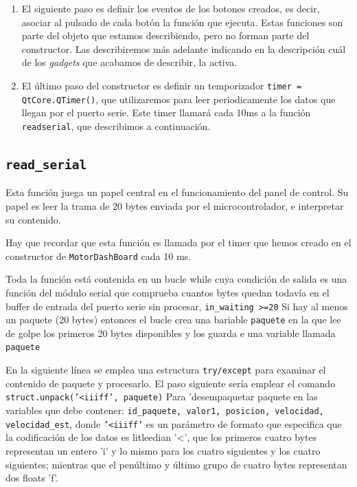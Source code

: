 \begin{enumerate}
\begin{enumerate}
        \item \texttt{btn\_speed\_ss} Análogo al anterior, solo que ahora el control de velocidad se lleva a cabo empleando realimentación de estados estimados.   
    \end{enumerate}
    \item El siguiente paso es definir los eventos de los botones creados, es decir, asociar al pulsado de cada botón la función que ejecuta. Estas funciones son parte del objeto que estamos describiendo, pero no forman parte del constructor. Las describiremos más adelante indicando en la descripción cuál de los \emph{gadgets} que acabamos de describir, la activa.
    \item El último paso del constructor es definir un temporizador \texttt{timer = QtCore.QTimer()}, que utilizaremos para leer periodicamente los datos que llegan por el puerto serie. Este timer llamará cada 10ms a la función \texttt{read\:serial}, que describimos a continuación.
\end{enumerate}

\subsection{\texttt{read\_serial}}
Esta función juega un papel central en el funcionamiento del panel de control. Su papel es leer la trama de 20 bytes enviada por el microcontrolador, e interpretar su contenido.

Hay que recordar que esta función es llamada por el timer que hemos creado en el constructor de \texttt{MotorDashBoard} cada 10 ms.

Toda la función está contenida en un bucle while cuya condición de salida es una función del módulo serial que comprueba cuantos bytes quedan todavía en el buffer de entrada del puerto serie sin procesar, \texttt{in\_waiting >=20} Si hay al menos un paquete (20 bytes) entonces el bucle crea una bariable \texttt{paquete} en la que lee de golpe los primeros 20 bytes disponibles y los guarda e una variable llamada \texttt{paquete}

En la siguiente línea se emplea una estructura \texttt{try/except} para examinar el contenido de paquete y procesarlo. El paso siguiente sería emplear el comando \texttt{struct.unpack('<iiiff', paquete)} Para 'desempaquetar paquete en las variables que debe contener: \texttt{id\_paquete, valor1, posicion, velocidad, velocidad\_est}, donde \texttt{'<iiiff'} es un parámetro de formato que especifica que la codificación de los datos es litleedian '<', que los primeros cuatro bytes representan un entero 'i' y lo mismo para los cuatro siguientes y los cuatro siguientes; mientras que el penúltimo y último grupo de cuatro bytes representan dos floats 'f'.


